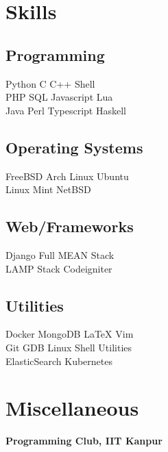 \documentclass[]{deedy-resume-openfont}
\begin{document}
\begin{minipage}[t]{0.30\textwidth}

\section{Skills}
\subsection{Programming}
Python \textbullet{} C \textbullet{} C++ \textbullet{} Shell \\
 \vspace{0.1 cm}
PHP \textbullet{} SQL \textbullet{} Javascript \textbullet{}  Lua \\
 Java \textbullet{} Perl \textbullet{} Typescript \textbullet{} Haskell \\
\vspace{0.4 cm}
\subsection{Operating Systems}
FreeBSD \textbullet{} Arch Linux \textbullet{} Ubuntu \\
Linux Mint \textbullet{} NetBSD
\vspace{0.4 cm} 
\subsection{Web/Frameworks}
Django \textbullet{} Full MEAN Stack \\
LAMP Stack \textbullet{} Codeigniter \\
\vspace{0.4 cm}
\subsection{Utilities}
Docker \textbullet{} MongoDB \textbullet{} \LaTeX{} \textbullet{} Vim \\
Git \textbullet{} GDB \textbullet{} Linux Shell Utilities \\
ElasticSearch \textbullet{} Kubernetes \\


\vspace{0.2cm}
\section{Miscellaneous}
\textbf{Programming Club, IIT Kanpur}
\vspace{0.1cm}


\end{minipage}
\end{document}
